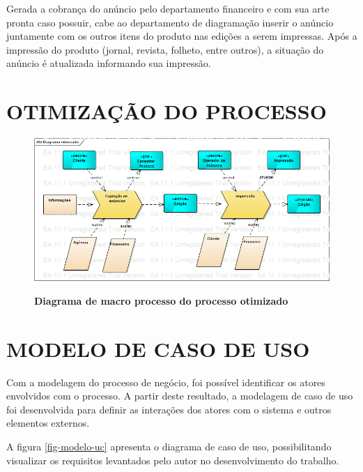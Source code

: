 \documentclass[
	12pt,				%
	openright,			%
	oneside,			%
	a4paper,			%
	chapter=TITLE,		%
	section=TITLE,		%
	english,			%
	french,				%
	spanish,			%
	brazil				%
	]{abntex2}
\begin{document}
Gerada a cobrança do anúncio pelo departamento financeiro e com sua arte pronta caso possuir, cabe ao departamento de diagramação inserir o anúncio juntamente com os outros itens do produto nas edições a serem impressas. Após a impressão do produto (jornal, revista, folheto, entre outros), a situação do anúncio é atualizada informando sua impressão.

\section{OTIMIZAÇÃO DO PROCESSO}


\begin{figure}[htb]
	\begin{center}
		\caption{
			\textbf{Diagrama de macro processo do processo otimizado}
		}\label{fig-diag-macroprocesso-otimizado}
		\includegraphics [scale=0.5]{imagens/diagrama_macro_processo_otimizado.png}
		\label{fig-diag-macroprocesso-otimizado}
	\end{center}
\end{figure}

\section{MODELO DE CASO DE USO}
Com a modelagem do processo de negócio, foi possível identificar os atores envolvidos com o processo. A partir deste resultado, a modelagem de caso de uso foi desenvolvida para definir as interações dos atores com o sistema e outros elementos externos.

A figura \ref{fig-modelo-uc} apresenta o diagrama de caso de uso, possibilitando visualizar os requisitos levantados pelo autor no desenvolvimento do trabalho. \\ \\ \\ \\ \\ \\ \\
\end{document}
